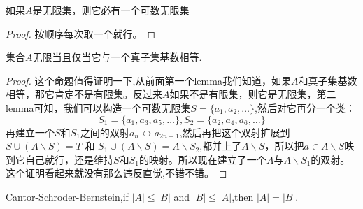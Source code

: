 \begin{lemma}
如果$A$是无限集，则它必有一个可数无限集
\end{lemma}

\begin{proof}
按顺序每次取一个就行。
\end{proof}

\begin{proposition}
集合$A$无限当且仅当它与一个真子集基数相等.
\end{proposition}

\begin{proof}
这个命题值得证明一下,从前面第一个lemma我们知道，如果$A$和真子集基数相等，那它肯定不是有限集。反过来$A$如果不是有限集，则它是无限集，第二lemma可知，我们可以构造一个可数无限集$S=\{a_1,a_2,\ldots\}$,然后对它再分一个类：\[S_1 = \{a_1, a_3, a_5, \ldots\}, S_2 = \{a_2, a_4, a_6, \ldots\}\]再建立一个$S$和$S_1$之间的双射$a_n \leftrightarrow a_{2n-1}$,然后再把这个双射扩展到$S \cup (A \smallsetminus S) = T$ 和 $S_1 \cup (A \smallsetminus S) = A \smallsetminus S_2$,都并上了$A \smallsetminus S$，所以把$a \in A \smallsetminus S$映到它自己就行，还是维持$S$和$S_1$的映射。所以现在建立了一个$A$与$A \smallsetminus S_1$的双射。这个证明看起来就没有那么违反直觉,不错不错。
\end{proof}

\begin{theorem}
Cantor-Schroder-Bernstein,if $|A|\leq|B|$ and $|B|\leq |A|$,then $|A|=|B|$.
\end{theorem}

